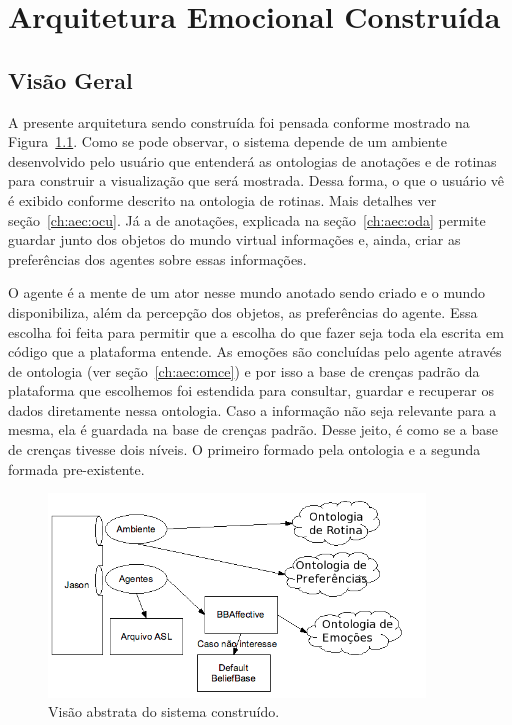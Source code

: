 \chapter{Arquitetura Emocional Constru\'ida} \label{ch:aec}

\section{Visão Geral}

A presente arquitetura sendo construída foi pensada conforme mostrado na
Figura~\ref{fig:vasc}. Como se pode observar, o sistema depende de um ambiente
desenvolvido pelo usuário que entenderá as ontologias de anotações e de
rotinas para construir a visualização que será mostrada. Dessa forma, o que o
usuário vê é exibido conforme descrito na ontologia de rotinas. Mais detalhes
ver seção~\ref{ch:aec:ocu}. Já a de anotações, explicada na
seção~\ref{ch:aec:oda} permite guardar junto dos
objetos do mundo virtual informações e, ainda, criar as preferências dos
agentes sobre essas informações.

O agente é a mente de um ator nesse mundo anotado sendo criado e o mundo
disponibiliza, além da percepção dos objetos, as preferências do agente\dev{}.
Essa escolha foi feita para permitir que a escolha do que fazer seja toda ela
escrita em código\dev{} que a plataforma \jason entende. As emoções são
concluídas pelo agente através de ontologia (ver seção~\ref{ch:aec:omce}) e
por isso a base de crenças padrão da plataforma que escolhemos foi estendida
para consultar, guardar e recuperar os dados diretamente nessa ontologia. Caso
a informação não seja relevante para a mesma, ela é guardada na base de
crenças padrão. Desse jeito, é como se a base de crenças tivesse dois níveis.
O primeiro formado pela ontologia e a segunda formada pre-existente.

\begin{figure}
  \centering
  \includegraphics[width=10cm]{figuras/visao-geral.png}
  \caption{Visão abstrata do sistema construído.}
  \label{fig:vasc}
\end{figure}

